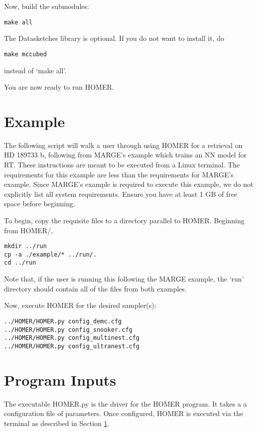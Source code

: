 \documentclass[letterpaper, 12pt]{article}
\begin{document}
\noindent Now, build the submodules:

\begin{verbatim}
make all
\end{verbatim}

\noindent The Datasketches library is optional.  If you do not want to install it, do 
\begin{verbatim}
make mccubed
\end{verbatim}
\noindent instead of `make all'.

\noindent You are now ready to run HOMER.


\section{Example}
\label{sec:example}

The following script will walk a user through using HOMER for a retrieval on 
HD 189733 b, following from MARGE's example which trains an NN model for RT. 
These instructions are meant to be executed from a Linux terminal.  
The requirements for this example are less than the requirements for MARGE's 
example.  Since MARGE's example is required to execute this example, we do 
not explicitly list all system requirements.  Ensure you have at least 1 GB of 
free space before beginning.

\noindent To begin, copy the requisite files to a directory parallel to HOMER. 
Beginning from HOMER/, 
\begin{verbatim}
mkdir ../run
cp -a ./example/* ../run/.
cd ../run
\end{verbatim}
\noindent Note that, if the user is running this following the MARGE example, 
the `run' directory should contain all of the files from both examples.

\noindent Now, execute HOMER for the desired sampler(s):

\begin{verbatim}
../HOMER/HOMER.py config_demc.cfg
../HOMER/HOMER.py config_snooker.cfg
../HOMER/HOMER.py config_multinest.cfg
../HOMER/HOMER.py config_ultranest.cfg
\end{verbatim}


\section{Program Inputs}
\label{sec:inputs}

The executable HOMER.py is the driver for the HOMER program. It takes a 
a configuration file of parameters.  Once configured, HOMER is executed via 
the terminal as described in Section \ref{sec:example}.
\end{document}
